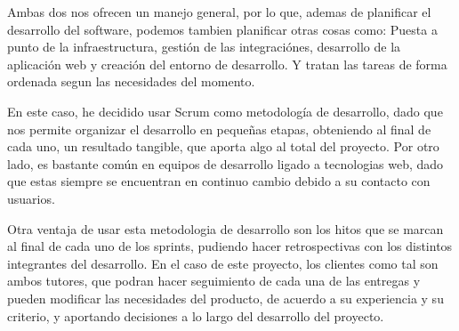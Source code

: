 Ambas dos nos ofrecen un manejo general, por lo que, ademas de planificar el
desarrollo del software, podemos tambien planificar otras cosas como: Puesta a
punto de la infraestructura, gestión de las integraciónes, desarrollo de la
aplicación web y creación del entorno de desarrollo\cite{AlZewairi2017}. Y tratan las tareas de forma ordenada segun las necesidades del momento.

En este caso, he decidido usar Scrum como metodología de desarrollo, dado que
nos permite organizar el desarrollo en pequeñas etapas, obteniendo al final de
cada uno, un resultado tangible, que aporta algo al total del proyecto.
Por otro lado, es bastante común en equipos de desarrollo ligado a tecnologias
web, dado que estas siempre se encuentran en continuo cambio debido a su
contacto con usuarios.

Otra ventaja de usar esta metodologia de desarrollo son los hitos que se marcan
al final de cada uno de los sprints, pudiendo hacer retrospectivas con los
distintos integrantes del desarrollo. En el caso de este proyecto, los clientes
como tal son ambos tutores, que podran hacer seguimiento de cada una de las
entregas y pueden modificar las necesidades del producto, de acuerdo a su
experiencia y su criterio, y aportando decisiones a lo largo del desarrollo del proyecto.

